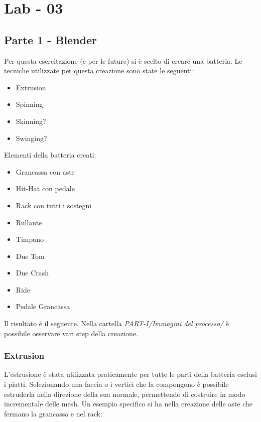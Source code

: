 \chapter*{Lab - 03}

\section{Parte 1 - Blender}
Per questa esercitazione (e per le future) si è scelto di creare una batteria. Le tecniche utilizzate per questa creazione sono state le seguenti:
\begin{itemize}
  \item Extrusion
  \item Spinning
  \item Skinning?
  \item Swinging?
\end{itemize}
Elementi della batteria creati:
  \begin{multicols}{3}
    \begin{itemize}
      \item Grancassa con aste
	  \item Hit-Hat con pedale
	  \item Rack con tutti i sostegni
	  \item Rullante
	  \item Timpano
	  \item Due Tom
	  \item Due Crash
	  \item Ride
	  \item Pedale Grancassa
    \end{itemize}
  \end{multicols}
Il risultato è il seguente. Nella cartella \textit{PART-I/Immagini del processo/} è possibile osservare vari step della creazione.
\begin{figure}[hbt]
    \centering
	\vspace{-0.2cm}
\end{figure}

\subsection{Extrusion}
L'estrusione è stata utilizzata praticamente per tutte le parti della batteria esclusi i piatti. Selezionando una faccia o i vertici che la compongono è possibile estruderla nella direzione della sua normale, permettendo di costruire in modo incrementale delle mesh. Un esempio specifico si ha nella creazione delle aste che fermano la grancassa e nel rack:
\begin{figure}[hbt]
    \centering
	\vspace{-0.2cm}
\end{figure}

